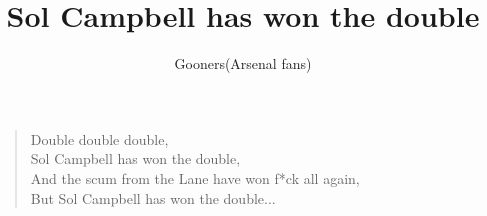 \documentclass[a4paper,12pt]{article}
\title{Sol Campbell has won the double}
\author{Gooners(Arsenal fans)}
\date{}
\begin{document}
	
	\maketitle
	
	\begin{verse}
		
		Double double double, \\
		Sol Campbell has won the double, \\
		And the scum from the Lane have won f*ck all again, \\
		But Sol Campbell has won the double$\ldots$
		
	\end{verse}
	
\end{document}
